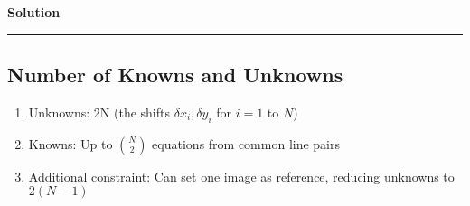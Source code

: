 \documentclass[a4paper,12pt]{article}
\newenvironment{solution}[2][]{%
    \begin{mdframed}[linecolor=blue!70!black, linewidth=2pt, roundcorner=10pt, backgroundcolor=yellow!10!white, skipabove=12pt, skipbelow=12pt]%
        \textbf{\large #2}
        \par\noindent\rule{\textwidth}{0.4pt}
}{
    \end{mdframed}
}
\begin{document}
\begin{solution}{Solution}
\subsection{Number of Knowns and Unknowns}

\begin{enumerate}
\item Unknowns: 2N (the shifts $\delta x_i, \delta y_i$ for $i = 1$ to $N$)
\item Knowns: Up to $\binom{N}{2}$ equations from common line pairs
\item Additional constraint: Can set one image as reference, reducing unknowns to $2(N-1)$
\end{enumerate}

\end{solution}
\end{document}
